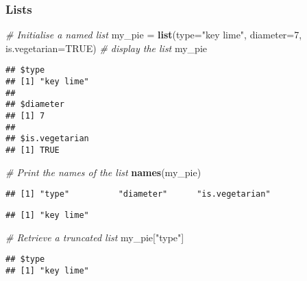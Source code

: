 \documentclass[
]{article}
\newenvironment{Shaded}{\begin{snugshade}}{\end{snugshade}}
\newcommand{\AttributeTok}[1]{\textcolor[rgb]{0.13,0.29,0.53}{#1}}
\newcommand{\CommentTok}[1]{\textcolor[rgb]{0.56,0.35,0.01}{\textit{#1}}}
\newcommand{\ConstantTok}[1]{\textcolor[rgb]{0.56,0.35,0.01}{#1}}
\newcommand{\DecValTok}[1]{\textcolor[rgb]{0.00,0.00,0.81}{#1}}
\newcommand{\FunctionTok}[1]{\textcolor[rgb]{0.13,0.29,0.53}{\textbf{#1}}}
\newcommand{\NormalTok}[1]{#1}
\newcommand{\OtherTok}[1]{\textcolor[rgb]{0.56,0.35,0.01}{#1}}
\newcommand{\SpecialCharTok}[1]{\textcolor[rgb]{0.81,0.36,0.00}{\textbf{#1}}}
\newcommand{\StringTok}[1]{\textcolor[rgb]{0.31,0.60,0.02}{#1}}
\begin{document}
\hypertarget{lists}{%
\subsubsection{Lists}\label{lists}}

\begin{Shaded}
\begin{Highlighting}[]
\CommentTok{\# Initialise a named list}
\NormalTok{my\_pie }\OtherTok{=} \FunctionTok{list}\NormalTok{(}\AttributeTok{type=}\StringTok{"key lime"}\NormalTok{, }\AttributeTok{diameter=}\DecValTok{7}\NormalTok{, }\AttributeTok{is.vegetarian=}\ConstantTok{TRUE}\NormalTok{)}
\CommentTok{\# display the list}
\NormalTok{my\_pie}
\end{Highlighting}
\end{Shaded}

\begin{verbatim}
## $type
## [1] "key lime"
## 
## $diameter
## [1] 7
## 
## $is.vegetarian
## [1] TRUE
\end{verbatim}

\begin{Shaded}
\begin{Highlighting}[]
\CommentTok{\# Print the names of the list}
\FunctionTok{names}\NormalTok{(my\_pie)}
\end{Highlighting}
\end{Shaded}

\begin{verbatim}
## [1] "type"          "diameter"      "is.vegetarian"
\end{verbatim}

\begin{Shaded}
\end{Shaded}

\begin{verbatim}
## [1] "key lime"
\end{verbatim}

\begin{Shaded}
\begin{Highlighting}[]
\CommentTok{\# Retrieve a truncated list}
\NormalTok{my\_pie[}\StringTok{"type"}\NormalTok{]}
\end{Highlighting}
\end{Shaded}

\begin{verbatim}
## $type
## [1] "key lime"
\end{verbatim}
\end{document}
